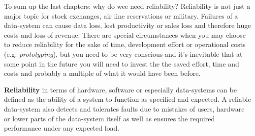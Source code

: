 To sum up the last chapters: why do wee need reliability? Reliability is not just a major topic for stock exchanges, air line reservations or military. Failures of a data-system can cause data loss, lost productivity or sales loss and therefore huge costs and loss of revenue. There are special circumstances when you may choose to reduce reliability for the sake of time, development effort or operational costs (e.g. \textit{prototyping}), but you need to be very conscious and it's inevitable that at some point in the future you will need to invest the the saved effort, time and costs and probably a multiple of what it would have been before.\\[1.0 cm]
\hspace*{4mm}%
\hspace*{4mm}%
\begin{minipage}{0.8\textwidth}\raggedright
\textbf{Reliability} in terms of hardware, software or especially data-systems can be defined as the ability of a system to function as specified and expected. A reliable data-system also detects and tolerates faults due to mistakes of users, hardware or lower parts of the data-system itself as well as ensures the required performance under any expected load. \\[0.4 cm]
\end{minipage}\\

